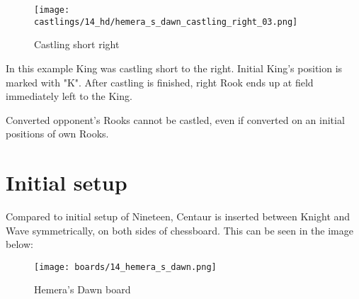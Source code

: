 \noindent
\begin{figure}[!h]
\texttt{[image: castlings/14\_hd/hemera\_s\_dawn\_castling\_right\_03.png]}
\caption{Castling short right}
\label{fig:hemera_s_dawn_castling_right_03}
\end{figure}

In this example King was castling short to the right. Initial King's position is marked with "K".
After castling is finished, right Rook ends up at field immediately left to the King.

Converted opponent's Rooks cannot be castled, even if converted on an initial positions
of own Rooks.

\clearpage %

\section*{Initial setup}

Compared to initial setup of Nineteen, Centaur is inserted between Knight and Wave
symmetrically, on both sides of chessboard. This can be seen in the image below:

\noindent
\begin{figure}[h]
\texttt{[image: boards/14\_hemera\_s\_dawn.png]}
\caption{Hemera's Dawn board}
\label{fig:14_hemera_s_dawn}
\end{figure}

\clearpage %
